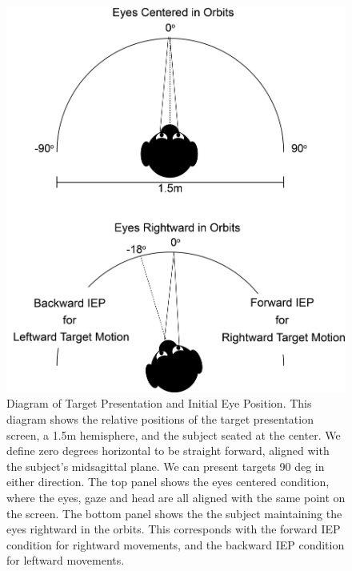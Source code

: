 \documentclass[12pt]{article}
\begin{document}
\begin{figure}[h]
\centering
\includegraphics[width=0.7\linewidth]{./figs/IEPMethodsFigure}
\caption[Diagram of target presentation and initial eye position]{Diagram of Target Presentation and Initial Eye Position. This diagram shows the relative positions of the target presentation screen, a 1.5m hemisphere, and the subject seated at the center. We define zero degrees horizontal to be straight forward, aligned with the subject's midsagittal plane. We can present targets 90 deg in either direction. The top panel shows the eyes centered condition, where the eyes, gaze and head are all aligned with the same point on the screen. The bottom panel shows the the subject maintaining the eyes rightward in the orbits. This corresponds with the forward IEP condition for rightward movements, and the backward IEP condition for leftward movements.}
\label{fig:IEPMethodsFigure}
\end{figure}
\end{document}
